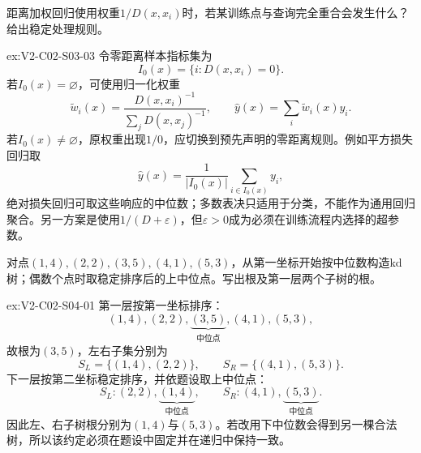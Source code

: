 \begin{SLChapterExercisePairSection}
\begin{exercise}\label{ex:V2-C02-S03-03}
距离加权回归使用权重$1/D(x,x_i)$时，若某训练点与查询完全重合会发生什么？给出稳定处理规则。
\end{exercise}
\ifSLFullEdition
{}\label{sol:V2-C02-S03-03}
\begin{chapterexercisesolution}{ex:V2-C02-S03-03}
令零距离样本指标集为
\[
I_0(x)=\{i:D(x,x_i)=0\}.
\]
若$I_0(x)=\varnothing$，可使用归一化权重
\[
\widetilde w_i(x)
=\frac{D(x,x_i)^{-1}}{\sum_jD(x,x_j)^{-1}},
\qquad
\widehat y(x)=\sum_i\widetilde w_i(x)y_i.
\]
若$I_0(x)\neq\varnothing$，原权重出现$1/0$，应切换到预先声明的零距离规则。例如平方损失回归取
\[
\widehat y(x)=\frac1{|I_0(x)|}\sum_{i\in I_0(x)}y_i,
\]
绝对损失回归可取这些响应的中位数；多数表决只适用于分类，不能作为通用回归聚合。另一方案是使用$1/(D+\varepsilon)$，但$\varepsilon>0$成为必须在训练流程内选择的超参数。
\end{chapterexercisesolution}
\fi

\begin{exercise}\label{ex:V2-C02-S04-01}
对点$(1,4),(2,2),(3,5),(4,1),(5,3)$，从第一坐标开始按中位数构造kd树；偶数个点时取稳定排序后的上中位点。写出根及第一层两个子树的根。
\end{exercise}
\ifSLFullEdition
{}\label{sol:V2-C02-S04-01}
\begin{chapterexercisesolution}{ex:V2-C02-S04-01}
第一层按第一坐标排序：
\[
(1,4),(2,2),\underbrace{(3,5)}_{\text{中位点}},(4,1),(5,3),
\]
故根为$(3,5)$，左右子集分别为
\[
S_L=\{(1,4),(2,2)\},
\qquad
S_R=\{(4,1),(5,3)\}.
\]
下一层按第二坐标稳定排序，并依题设取上中位点：
\[
S_L:(2,2),\underbrace{(1,4)}_{\text{中位点}},
\qquad
S_R:(4,1),\underbrace{(5,3)}_{\text{中位点}}.
\]
因此左、右子树根分别为$(1,4)$与$(5,3)$。若改用下中位数会得到另一棵合法树，所以该约定必须在题设中固定并在递归中保持一致。
\end{chapterexercisesolution}
\fi


\end{SLChapterExercisePairSection}
